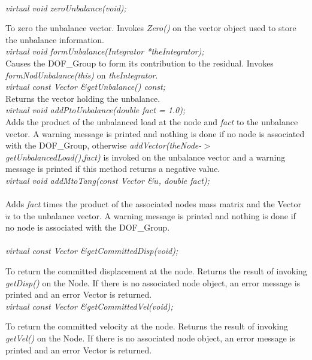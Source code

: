   \\
{\em virtual void zeroUnbalance(void);}

To zero the unbalance vector. Invokes {\em Zero()} on the vector
object used to store the unbalance information. \\

{\em virtual void formUnbalance(Integrator *theIntegrator); }\\
Causes the DOF\_Group to form its contribution to the residual. Invokes
{\em formNodUnbalance(this)} on {\em theIntegrator}.\\

{\em virtual const Vector \&getUnbalance() const; } \\
Returns the vector holding the unbalance. \\

{\em virtual void  addPtoUnbalance(double fact = 1.0);} \\
Adds the product of the unbalanced load at the node and {\em fact} to
the unbalance vector. A warning message is printed and nothing is done
if no node is associated with the DOF\_Group, otherwise {\em
addVector(theNode-$>$getUnbalancedLoad(),fact)} is invoked on the
unbalance vector and a warning message is printed if this method
returns a negative value. \\ 

{\em virtual void addMtoTang(const Vector \&$\ddot u$,
double fact);}\\ \\ 
Adds {\em fact} times the product of the associated nodes mass matrix
and the Vector $\ddot u$ to the unbalance vector. A warning message is
printed and nothing is done if no node is associated with the
DOF\_Group. \\

  \\
{\em virtual const Vector \&getCommittedDisp(void);} 

To return the committed displacement at the node. Returns the result
of invoking {\em getDisp()} on the Node. If there is no associated
node object, an error message is printed and an error Vector is
returned. \\


{\em virtual const Vector \&getCommittedVel(void);} 

To return the committed velocity at the node. Returns the result of
invoking {\em getVel()} on the Node. If there is no associated node
object, an error message is printed and an error Vector is returned. \\

